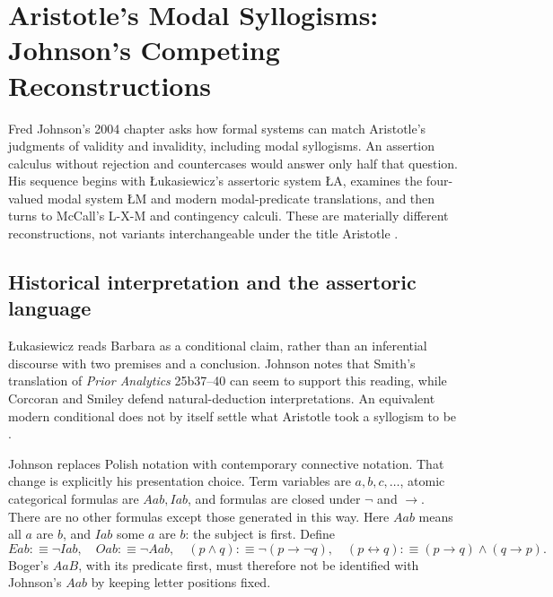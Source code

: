 \chapter{Aristotle's Modal Syllogisms: Johnson's Competing Reconstructions}
\label{sec:p13-src063-0104}

Fred Johnson's 2004 chapter asks how formal systems can match Aristotle's
judgments of validity and invalidity, including modal syllogisms.
An assertion calculus without rejection and countercases would answer only
half that question. His sequence begins with \L{}ukasiewicz's assertoric
system \L{}A, examines the four-valued modal system \L{}M and modern
modal-predicate translations, and then turns to McCall's L-X-M and
contingency calculi. These are materially different reconstructions, not
variants interchangeable under the title Aristotle
\parencite[pp.~247--265]{Johnson2004ModalSyllogisms}.

\section{Historical interpretation and the assertoric language}
\label{sec:p13-johnson-assertoric}

\L{}ukasiewicz reads Barbara as a conditional claim, rather than an
inferential discourse with two premises and a conclusion. Johnson notes
that Smith's translation of \emph{Prior Analytics} 25b37--40 can seem to
support this reading, while Corcoran and Smiley defend natural-deduction
interpretations. An equivalent modern conditional does not by itself
settle what Aristotle took a syllogism to be
\parencite[pp.~247--248]{Johnson2004ModalSyllogisms}.

Johnson replaces Polish notation with contemporary connective notation.
That change is explicitly his presentation choice.
Term variables are \(a,b,c,\ldots\), atomic categorical formulas are
\(Aab,Iab\), and formulas are closed under \(\neg\) and \(\to\).
There are no other formulas except those generated in this way.
Here \(Aab\) means all \(a\) are \(b\), and \(Iab\) some \(a\) are \(b\):
the subject is first. Define
\[
 Eab\mathrel{:\equiv}\neg Iab,\quad
 Oab\mathrel{:\equiv}\neg Aab,\quad
 (p\land q)\mathrel{:\equiv}\neg(p\to\neg q),\quad
 (p\leftrightarrow q)\mathrel{:\equiv}(p\to q)\land(q\to p).
\]
Boger's \(AaB\), with its predicate first, must therefore not be
identified with Johnson's \(Aab\) by keeping letter positions fixed.


